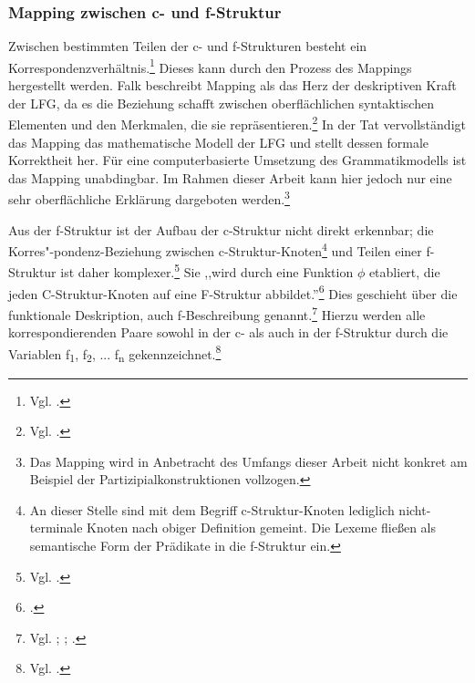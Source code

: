 \documentclass[12pt,a4paper]{article}
\begin{document}
\subsubsection{Mapping zwischen c- und f-Struktur}
Zwischen bestimmten Teilen der c- und f-Strukturen besteht ein Korrespondenzverhältnis.\footnote{Vgl. \cite[8]{Skript}.} Dieses kann durch den Prozess des Mappings hergestellt werden. Falk beschreibt Mapping als das Herz der deskriptiven Kraft der LFG, da es die Beziehung schafft zwischen oberflächlichen syntaktischen Elementen und den Merkmalen, die sie repräsentieren.\footnote{Vgl. \cite[62; 68]{Falk}.} In der Tat vervollständigt das Mapping das mathematische Modell der LFG und stellt dessen formale Korrektheit her. Für eine computerbasierte Umsetzung des Grammatikmodells ist das Mapping unabdingbar. Im Rahmen dieser Arbeit kann hier jedoch nur eine sehr oberflächliche Erklärung dargeboten werden.\footnote{Das Mapping wird in Anbetracht des Umfangs dieser Arbeit nicht konkret am Beispiel der Partizipialkonstruktionen vollzogen.}

Aus der f-Struktur ist der Aufbau der c-Struktur nicht direkt erkennbar; die Korres"-pondenz-Beziehung zwischen c-Struktur-Knoten\footnote{An dieser Stelle sind mit dem Begriff c-Struktur-Knoten lediglich nicht-terminale Knoten nach obiger Definition gemeint. Die Lexeme fließen als semantische Form der Prädikate in die f-Struktur ein.} und Teilen einer f-Struktur ist daher komplexer.\footnote{Vgl. \cite[55]{Falk}.} Sie ,,wird durch eine Funktion $\phi$ etabliert, die jeden C-Struktur-Knoten auf eine F-Struktur abbildet.''\footnote{\cite[8]{Skript}.} Dies geschieht über die funktionale Deskription, auch f-Beschreibung genannt.\footnote{Vgl. \cite[63-4]{Falk}; \cite[34]{Rohrer}; \cite[17]{Skript}.} Hierzu werden alle korrespondierenden Paare sowohl in der c- als auch in der f-Struktur durch die Variablen f\textsubscript{1}, f\textsubscript{2}, ... f\textsubscript{n} gekennzeichnet.\footnote{Vgl. \cite[65]{Falk}.} 
\end{document}
